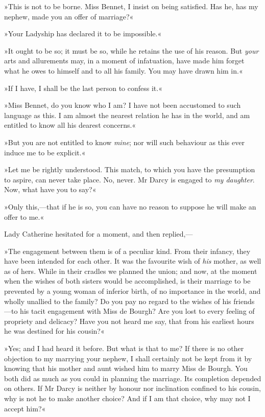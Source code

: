 »This is not to be borne. Miss Bennet, I insist on being satisfied. Has he, has my nephew, made you an offer of marriage?«

»Your Ladyship has declared it to be impossible.«

»It ought to be so; it must be so, while he retains the use of his reason. But \textit{your} arts and allurements may, in a moment of infatuation, have made him forget what he owes to himself and to all his family. You may have drawn him in.«

»If I have, I shall be the last person to confess it.«

»Miss Bennet, do you know who I am? I have not been accustomed to such language as this. I am almost the nearest relation he has in the world, and am entitled to know all his dearest concerns.«

»But you are not entitled to know \textit{mine}; nor will such behaviour as this ever induce me to be explicit.«

»Let me be rightly understood. This match, to which you have the presumption to aspire, can never take place. No, never. Mr Darcy is engaged to \textit{my daughter}. Now, what have you to say?«

»Only this,—that if he is so, you can have no reason to suppose he will make an offer to me.«

Lady Catherine hesitated for a moment, and then replied,—

»The engagement between them is of a peculiar kind. From their infancy, they have been intended for each other. It was the favourite wish of \textit{his} mother, as well as of hers. While in their cradles we planned the union; and now, at the moment when the wishes of both sisters would be accomplished, is their marriage to be prevented by a young woman of inferior birth, of no importance in the world, and wholly unallied to the family? Do you pay no regard to the wishes of his friends—to his tacit engagement with Miss de Bourgh? Are you lost to every feeling of propriety and delicacy? Have you not heard me say, that from his earliest hours he was destined for his cousin?«

»Yes; and I had heard it before. But what is that to me? If there is no other objection to my marrying your nephew, I shall certainly not be kept from it by knowing that his mother and aunt wished him to marry Miss de Bourgh. You both did as much as you could in planning the marriage. Its completion depended on others. If Mr Darcy is neither by honour nor inclination confined to his cousin, why is not he to make another choice? And if I am that choice, why may not I accept him?«

